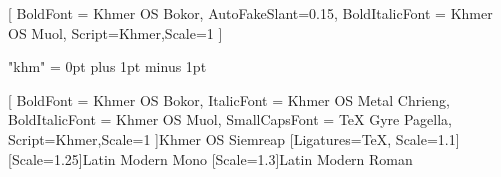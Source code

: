 \usepackage[no-math]{fontspec}
\setsansfont{Khmer OS Siemreap}[
	BoldFont = Khmer OS Bokor,
	AutoFakeSlant=0.15,
	BoldItalicFont = Khmer OS Muol,
	Script=Khmer,Scale=1
]
\usepackage[Khmer, Latin]{ucharclasses}
\usepackage{etoolbox}
\XeTeXlinebreaklocale "khm"
\XeTeXlinebreakskip = 0pt plus 1pt minus 1pt

\newfontfamily{\khmerfamily}
[
	BoldFont = Khmer OS Bokor,
	ItalicFont = Khmer OS Metal Chrieng,
	BoldItalicFont = Khmer OS Muol,
	SmallCapsFont = TeX Gyre Pagella,
	Script=Khmer,Scale=1
]{Khmer OS Siemreap}
[Ligatures=TeX, Scale=1.1] 
\newfontfamily{\monofamily}[Scale=1.25]{Latin Modern Mono}
\newfontfamily{\latinfamily}[Scale=1.3]{Latin Modern Roman}

\newrobustcmd{\englishfont}{\englishfamily\let\currentenglish\englishfamily }
\newrobustcmd{\khmerfont}{\khmerfamily\let\currentkhmer\khmerfamily}
\newrobustcmd{\mono}{\monofamily\let\currentenglish\monofamily }
\newrobustcmd{\en}{\latinfamily\let\currentenglish\latinfamily}



\khmerfont\englishfont
\setTransitionsForLatin{\currentenglish}{\currentkhmer}

\renewcommand{\ttfamily}{\mono}


\usepackage{bbold}
\let\altmathbb\mathbb
\AtBeginDocument{\let\mathbb\altmathbb}

\let\temp\rmdefault
\usepackage{mathpazo}
\let\rmdefault\temp



\newcommand{\kml}
{
	\fontspec[
		Script=Khmer, Scale=1,
		AutoFakeBold=1, AutoFakeSlant=0.25
	] {Khmer OS Muol Light}
	\selectfont
}

\newcommand{\km}
{
	\fontspec[
		Script=Khmer, Scale=1,
		AutoFakeBold=1, AutoFakeSlant=0.25
	] {Khmer OS Muol}
	\selectfont
}

\newcommand{\kpali}
{
	\fontspec[
		Script=Khmer, Scale=1,
		AutoFakeBold=1, AutoFakeSlant=0.25
	] {Khmer OS Muol Pali}
	\selectfont
}

\makeatletter
\def\khmer#1{\expandafter\@khmer\csname c@#1\endcsname}
\def\@khmer#1{\expandafter\@@khmer\number#1\@nil}
\def\@@khmer#1{%
	\ifx#1\@nil%
	\else%
	\ifcase#1 ០\or ១\or ២\or ៣\or ៤\or ៥\or ៦\or ៧\or ៨\or ៩\fi%
	\expandafter\@@khmer%
	 \fi}
	 
